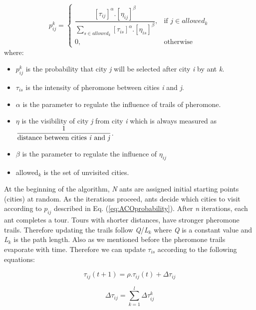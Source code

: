 \documentclass[twocolumn]{article}
\begin{document}
	\begin{equation} \label{eq:ACOprobability}
		\textit{p}^\textit{k}_\textit{ij} = 
	\begin{cases}
	{\dfrac{[\tau_{ij}]^\alpha \textbf{.} [\eta_{ij}]^\beta}
		{\sum_{s \in allowed_k} [\tau_{is}]^\alpha \textbf{.} [\eta_{is}]^\beta}  } ,& \text{if } \textit{j} \in \textit{allowed}_k
	\\
	0,& \text{otherwise}
	\end{cases}
	\end{equation}
	where:
	\begin{itemize}
		\renewcommand{\labelitemi}{-}
		\item $\textit{p}^\textit{k}_\textit{ij}$ is the probability that city \textit{j} will be selected after city \textit{i} by ant \textit{k}.
		\item $\tau_{is}$ is the intensity of pheromone between cities \textit{i} and \textit{j}.
		\item $\alpha$ is the parameter to regulate the influence of trails of pheromone.
		\item $\eta$ is the visibility of city \textit{j} from city \textit{i} which is always measured as $\dfrac{1}{\text{distance between cities \textit{i} and \textit{j}}}$.
		\item $\beta$ is the parameter to regulate the influence of $\eta_{ij}$
		\item allowed$_k$ is the set of unvisited cities.
	\end{itemize}

	At the beginning of the algorithm, \textit{N} ants are assigned initial starting points (cities) at random. As the iterations proceed, ants decide which cities to visit according to $\textit{p}_\textit{ij}$ described in Eq. (\ref{eq:ACOprobability}). After \textit{n} iterations, each ant completes a tour. Tours with shorter distances, have stronger pheromone trails. Therefore updating the trails follow \textit{Q}/\textit{L}$_\textit{k}$ where \textit{Q} is a constant value and \textit{L}$_\textit{k}$ is the path length. Also as we mentioned before the pheromone trails evaporate with time. Therefore we can update $\tau_{is}$ according to the following equations:
	
	\begin{equation} \label{eq:ACOTrailUpdate1}
		\tau_{ij}(t+1) = \rho \textbf{.} \tau_{ij}(t) + \Delta\tau_{ij}
	\end{equation}
	
	\begin{equation} \label{eq:ACOTrailUpdate2}
		\Delta\tau_{ij} = \sum_{k=1}^l \Delta\tau_{ij}^k
	\end{equation}
	
\end{document}
